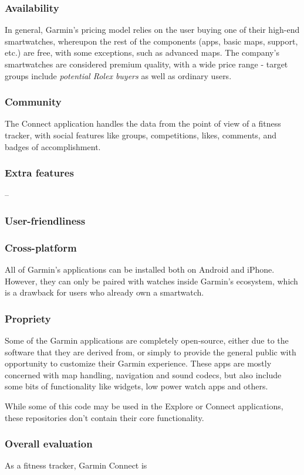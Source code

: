 \subsubsection*{Availability}
In general, Garmin's pricing model relies on the user buying one of their high-end smartwatches, whereupon the rest of the components (apps, basic maps, support, etc.) are free, with some exceptions, such as advanced maps. 
The company's smartwatches are considered premium quality, with a wide price range - target groups include \textit{potential Rolex buyers}\cite{garmin-expensive} as well as ordinary users.\cite{garmin-watches-review}
\subsubsection*{Community}
The Connect application handles the data from the point of view of a fitness tracker, with social features like groups, competitions, likes, comments, and badges of accomplishment.\cite{garmin-connect}
\subsubsection*{Extra features} -- 
\subsubsection*{User-friendliness}

\subsubsection*{Cross-platform}
All of Garmin's applications can be installed both on Android and iPhone.
However, they can only be paired with watches inside Garmin's ecosystem, which is a drawback for users who already own a smartwatch.
\subsubsection*{Propriety}
Some of the Garmin applications are completely open-source, either due to the software that they are derived from, or simply to provide the general public with opportunity to customize their Garmin experience.\cite{garmin-open-source}\cite{garmin-connect-github-repos}
These apps are mostly concerned with map handling, navigation and sound codecs, but also include some bits of functionality like widgets, low power watch apps and others.

While some of this code may be used in the Explore or Connect applications, these repositories don't contain their core functionality.

\subsubsection*{Overall evaluation}
As a fitness tracker, Garmin Connect is 

